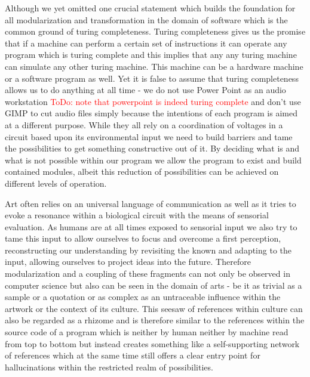 \documentclass[10pt,twocolumn,letterpaper]{article}
\newcommand\todo[1]{\textcolor{red}{ToDo: #1}}
\begin{document}
Although we yet omitted one crucial statement which builds the foundation for all modularization and transformation in the domain of software which is the common ground of turing completeness.
Turing completeness gives us the promise that if a machine can perform a certain set of instructions it can operate any program which is turing complete and this implies that any any turing machine can simulate any other turing machine.
This machine can be a hardware machine or a software program as well.
Yet it is false to assume that turing completeness allows us to do anything at all time - we do not use Power Point as an audio workstation \todo{note that powerpoint is indeed turing complete} and don't use GIMP to cut audio files simply because the intentions of each program is aimed at a different purpose.
While they all rely on a coordination of voltages in a circuit based upon its environmental input we need to build barriers and tame the possibilities to get something constructive out of it.
By deciding what is and what is not possible within our program we allow the program to exist and build contained modules, albeit this reduction of possibilities can be achieved on different levels of operation.

Art often relies on an universal language of communication as well as it tries to evoke a resonance within a biological circuit with the means of sensorial evaluation.
As humans are at all times exposed to sensorial input we also try to tame this input to allow ourselves to focus and overcome a first perception, reconstructing our understanding by revisiting the known and adapting to the input, allowing ourselves to project ideas into the future.
Therefore modularization and a coupling of these fragments can not only be observed in computer science but also can be seen in the domain of arts - be it as trivial as a sample or a quotation or as complex as an untraceable influence within the artwork or the context of its culture.
This seesaw of references within culture can also be regarded as a rhizome and is therefore similar to the references within the source code of a program which is neither by human neither by machine read from top to bottom but instead creates something like a self-supporting network of references which at the same time still offers a clear entry point for hallucinations within the restricted realm of possibilities.
\end{document}
